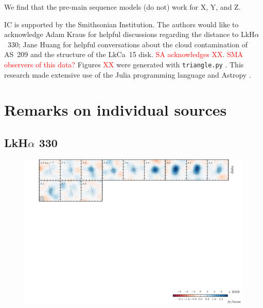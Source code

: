 \documentclass{aastex6}
\newcommand{\todo}[1]{ \textcolor{red}{#1}}
\begin{document}
We find that the pre-main sequence models (do not) work for X, Y, and Z.

\acknowledgments
IC is supported by the Smithsonian Institution. The authors would like to acknowledge Adam Kraus for helpful discussions regarding the distance to LkH$\alpha$~330; Jane Huang for helpful conversations about the cloud contamination of AS~209 and the structure of the LkCa~15 disk. \todo{SA acknowledges XX}. \todo{SMA observers of this data?}  Figures \todo{XX} were generated with \texttt{triangle.py} \citep{foreman-mackey14}. This research made extensive use of the Julia programming language \citep{julia12} and Astropy \citep{astropy13}.





\appendix

\section{Remarks on individual sources}

\subsection{LkH$\alpha$ 330}
\begin{figure}[htb]
\begin{center}
  \includegraphics{LkHa330.pdf}
  \end{center}
\end{figure}
\end{document}
